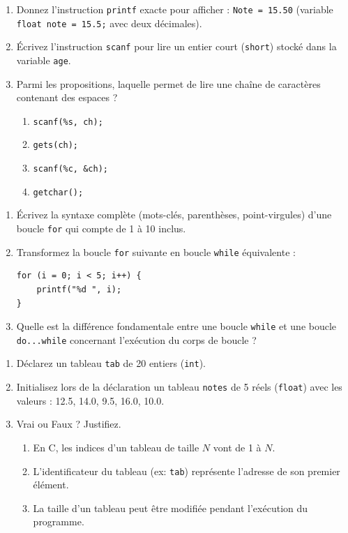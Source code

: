 \documentclass[11pt]{article}
\begin{document}
\begin{exercice}
\begin{enumerate}
    \item Donnez l'instruction \texttt{printf} exacte pour afficher : \texttt{Note = 15.50} (variable \texttt{float note = 15.5;} avec deux décimales).
    \item Écrivez l'instruction \texttt{scanf} pour lire un entier court (\texttt{short}) stocké dans la variable \texttt{age}.
    \item Parmi les propositions, laquelle permet de lire une chaîne de caractères contenant des espaces ?
    \begin{enumerate}
        \item \texttt{scanf(\%s, ch);}
        \item \texttt{gets(ch);}
        \item \texttt{scanf(\%c, \&ch);}
        \item \texttt{getchar();}
    \end{enumerate}
\end{enumerate}
\end{exercice}

\begin{exercice}
\begin{enumerate}
    \item Écrivez la syntaxe complète (mots-clés, parenthèses, point-virgules) d'une boucle \texttt{for} qui compte de 1 à 10 inclus.
    \item Transformez la boucle \texttt{for} suivante en boucle \texttt{while} équivalente :
\begin{verbatim}
for (i = 0; i < 5; i++) {
    printf("%d ", i);
}
\end{verbatim}
    \item Quelle est la différence fondamentale entre une boucle \texttt{while} et une boucle \texttt{do...while} concernant l'exécution du corps de boucle ?
\end{enumerate}
\end{exercice}

\begin{exercice}
\begin{enumerate}
    \item Déclarez un tableau \texttt{tab} de 20 entiers (\texttt{int}).
    \item Initialisez lors de la déclaration un tableau \texttt{notes} de 5 réels (\texttt{float}) avec les valeurs : 12.5, 14.0, 9.5, 16.0, 10.0.
    \item Vrai ou Faux ? Justifiez.
    \begin{enumerate}
        \item En C, les indices d'un tableau de taille $N$ vont de 1 à $N$.
        \item L'identificateur du tableau (ex: \texttt{tab}) représente l'adresse de son premier élément.
        \item La taille d'un tableau peut être modifiée pendant l'exécution du programme.
    \end{enumerate}
\end{enumerate}
\end{exercice}
\end{document}
